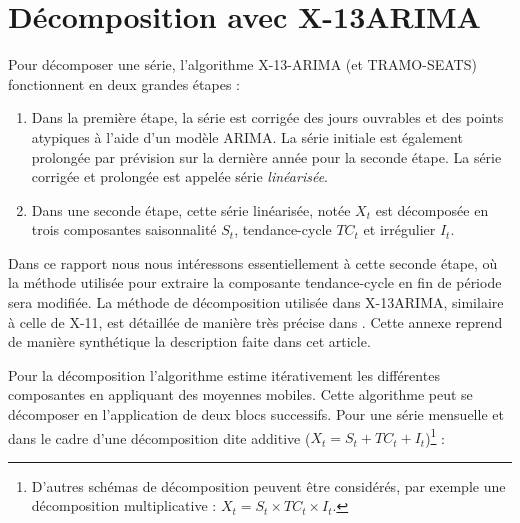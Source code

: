 \documentclass[
  11pt,
  french,
  a4paper]{article}
\newcommand\1{\mathds{1}}
\begin{document}
\newpage

\hypertarget{an-x11}{%
\section{Décomposition avec X-13ARIMA}\label{an-x11}}

Pour décomposer une série, l'algorithme X-13-ARIMA (et TRAMO-SEATS) fonctionnent en deux grandes étapes :

\begin{enumerate}
\def\labelenumi{\arabic{enumi}.}
\item
  Dans la première étape, la série est corrigée des jours ouvrables et des points atypiques à l'aide d'un modèle ARIMA. La série initiale est également prolongée par prévision sur la dernière année pour la seconde étape.
  La série corrigée et prolongée est appelée série \emph{linéarisée}.
\item
  Dans une seconde étape, cette série linéarisée, notée \(X_t\) est décomposée en trois composantes saisonnalité \(S_t\), tendance-cycle \(TC_t\) et irrégulier \(I_t\).
\end{enumerate}

Dans ce rapport nous nous intéressons essentiellement à cette seconde étape, où la méthode utilisée pour extraire la composante tendance-cycle en fin de période sera modifiée.
La méthode de décomposition utilisée dans X-13ARIMA, similaire à celle de X-11, est détaillée de manière très précise dans \textcite{ladiray1999comprendre}.
Cette annexe reprend de manière synthétique la description faite dans cet article.

Pour la décomposition l'algorithme estime itérativement les différentes composantes en appliquant des moyennes mobiles.
Cette algorithme peut se décomposer en l'application de deux blocs successifs.
Pour une série mensuelle et dans le cadre d'une décomposition dite additive (\(X_t=S_t+TC_t+I_t\))\footnote{
  D'autres schémas de décomposition peuvent être considérés, par exemple une décomposition multiplicative : \(X_t=S_t\times TC_t\times I_t\).} :
\end{document}
